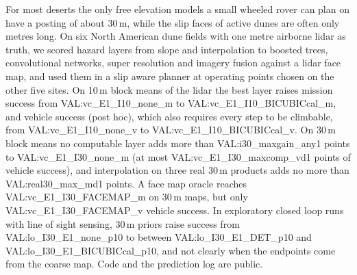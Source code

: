 For most deserts the only free elevation models a small wheeled rover can plan on have a posting of about 30\,m, while the slip faces of active dunes are often only metres long. On six North American dune fields with one metre airborne lidar as truth, we scored hazard layers from slope and interpolation to boosted trees, convolutional networks, super resolution and imagery fusion against a lidar face map, and used them in a slip aware planner at operating points chosen on the other five sites. On 10\,m block means of the lidar the best layer raises mission success from {{VAL:vc_E1_I10_none_m}} to {{VAL:vc_E1_I10_BICUBICcal_m}}, and vehicle success (post hoc), which also requires every step to be climbable, from {{VAL:vc_E1_I10_none_v}} to {{VAL:vc_E1_I10_BICUBICcal_v}}. On 30\,m block means no computable layer adds more than {{VAL:i30_maxgain_any1}} points to {{VAL:vc_E1_I30_none_m}} (at most {{VAL:vc_E1_I30_maxcomp_vd1}} points of vehicle success), and interpolation on three real 30\,m products adds no more than {{VAL:real30_max_md1}} points. A face map oracle reaches {{VAL:vc_E1_I30_FACEMAP_m}} on 30\,m maps, but only {{VAL:vc_E1_I30_FACEMAP_v}} vehicle success. In exploratory closed loop runs with line of sight sensing, 30\,m priors raise success from {{VAL:lo_I30_E1_none_p10}} to between {{VAL:lo_I30_E1_DET_p10}} and {{VAL:lo_I30_E1_BICUBICcal_p10}}, and not clearly when the endpoints come from the coarse map. Code and the prediction log are public.
